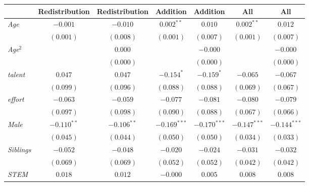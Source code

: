 
\begin{table}[htpb]
\begin{center}
\begin{footnotesize}
\begin{tabular}{l c c c c c c}
\toprule
 & Redistribution & Redistribution & Addition & Addition & All & All \\
\midrule
\textit{Age}                           & $-0.001$      & $-0.010$      & $0.002^{**}$   & $0.010$        & $0.002^{**}$   & $0.012$        \\
                                       & $(0.001)$     & $(0.008)$     & $(0.001)$      & $(0.007)$      & $(0.001)$      & $(0.007)$      \\
\textit{Age}$^2$                       &               & $0.000$       &                & $-0.000$       &                & $-0.000$       \\
                                       &               & $(0.000)$     &                & $(0.000)$      &                & $(0.000)$      \\
\textit{talent}                        & $0.047$       & $0.047$       & $-0.154^{*}$   & $-0.159^{*}$   & $-0.065$       & $-0.067$       \\
                                       & $(0.099)$     & $(0.096)$     & $(0.088)$      & $(0.088)$      & $(0.069)$      & $(0.067)$      \\
\textit{effort}                        & $-0.063$      & $-0.059$      & $-0.077$       & $-0.081$       & $-0.080$       & $-0.079$       \\
                                       & $(0.097)$     & $(0.098)$     & $(0.090)$      & $(0.088)$      & $(0.067)$      & $(0.066)$      \\
\textit{Male}                          & $-0.110^{**}$ & $-0.106^{**}$ & $-0.169^{***}$ & $-0.170^{***}$ & $-0.147^{***}$ & $-0.144^{***}$ \\
                                       & $(0.045)$     & $(0.044)$     & $(0.050)$      & $(0.050)$      & $(0.034)$      & $(0.033)$      \\
\textit{Siblings}                      & $-0.052$      & $-0.048$      & $-0.020$       & $-0.024$       & $-0.031$       & $-0.032$       \\
                                       & $(0.069)$     & $(0.069)$     & $(0.052)$      & $(0.052)$      & $(0.042)$      & $(0.042)$      \\
\textit{STEM}                          & $0.018$       & $0.012$       & $-0.000$       & $0.005$        & $0.008$        & $0.008$        \\

\end{tabular}
\end{footnotesize}
\end{center}
\end{table}
